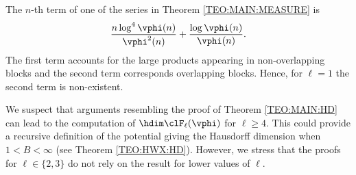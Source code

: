 \documentclass[12pt,a4paper]{amsart}
\begin{document}
\begin{rema01}
The $n$-th term of one of the series in Theorem \ref{TEO:MAIN:MEASURE} is
\[
\frac{n\log^{4}\vphi(n)}{\vphi^2(n)}
+
\frac{\log \vphi(n)}{\vphi(n)}.
\]
The first term accounts for the large products appearing in non-overlapping blocks and the second term corresponds overlapping blocks. Hence, for $\ell=1$ the second term is non-existent. %
\end{rema01}

\begin{rema01}
We suspect that arguments resembling the proof of Theorem \ref{TEO:MAIN:HD} can lead to the computation of $\hdim \clF_{\ell}(\vphi)$ for $\ell\geq 4$. This could provide a recursive definition of the potential giving the Hausdorff dimension when $1<B<\infty$ (see Theorem \ref{TEO:HWX:HD}). However, we stress that the proofs for $\ell\in\{2,3\}$ do not rely on the result for lower values of $\ell$.
\end{rema01}







\end{document}
